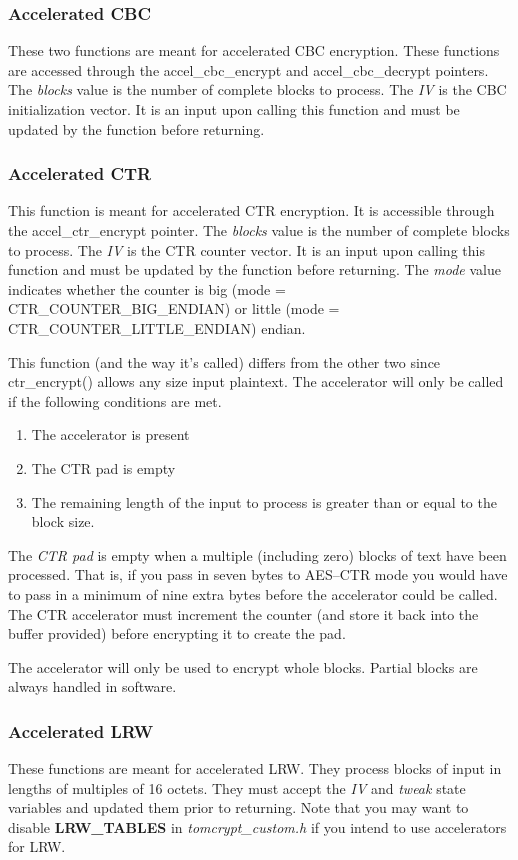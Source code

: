 \documentclass[synpaper]{book}
\begin{document}
\subsubsection{Accelerated CBC}
These two functions are meant for accelerated CBC encryption.  These functions are accessed through the accel\_cbc\_encrypt and accel\_cbc\_decrypt pointers.
The \textit{blocks} value is the number of complete blocks to process.  The \textit{IV} is the CBC initialization vector.  It is an input upon calling this function and must be
updated by the function before returning.

\subsubsection{Accelerated CTR}
This function is meant for accelerated CTR encryption.  It is accessible through the accel\_ctr\_encrypt pointer.
The \textit{blocks} value is the number of complete blocks to process.  The \textit{IV} is the CTR counter vector.  It is an input upon calling this function and must be
updated by the function before returning.  The \textit{mode} value indicates whether the counter is big (mode = CTR\_COUNTER\_BIG\_ENDIAN) or
little (mode = CTR\_COUNTER\_LITTLE\_ENDIAN) endian.

This function (and the way it's called) differs from the other two since ctr\_encrypt() allows any size input plaintext.  The accelerator will only be
called if the following conditions are met.

\begin{enumerate}
   \item The accelerator is present
   \item The CTR pad is empty
   \item The remaining length of the input to process is greater than or equal to the block size.
\end{enumerate}

The \textit{CTR pad} is empty when a multiple (including zero) blocks of text have been processed.  That is, if you pass in seven bytes to AES--CTR mode you would have to
pass in a minimum of nine extra bytes before the accelerator could be called.  The CTR accelerator must increment the counter (and store it back into the
buffer provided) before encrypting it to create the pad.

The accelerator will only be used to encrypt whole blocks.  Partial blocks are always handled in software.

\subsubsection{Accelerated LRW}
These functions are meant for accelerated LRW.  They process blocks of input in lengths of multiples of 16 octets.  They must accept the \textit{IV} and \textit{tweak}
state variables and updated them prior to returning.  Note that you may want to disable \textbf{LRW\_TABLES} in \textit{tomcrypt\_custom.h} if you intend
to use accelerators for LRW.
\end{document}
